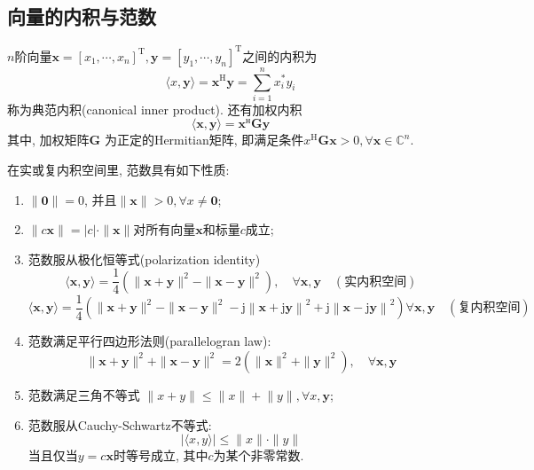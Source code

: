 \documentclass[lang=cn,10pt]{gorgeousnbook}
\numberwithin{equation}{section}%
\numberwithin{figure}{section}%
\begin{document}
\subsection{向量的内积与范数}
$n$阶向量$\boldsymbol{x}=[x_1,\cdots,x_n]^\mathrm{T},\boldsymbol{y}=[y_1,\cdots,y_n]^\mathrm{T}$之间的内积为
\begin{equation}
\langle x,\boldsymbol{y}\rangle=\boldsymbol{x^\mathrm{H}}\boldsymbol{y}=\sum_{i=1}^nx_i^*y_i
\end{equation}
称为典范内积(canonical inner product). 还有加权内积
\begin{equation}
\langle \bm{x,y}\rangle=\bm{x}^\text{н}\bm{ G y}
\end{equation}
其中, 加权矩阵$\bm{G}$ 为正定的Hermitian矩阵, 即满足条件$x^\text{H}{ \boldsymbol { G x }}>0,\forall\boldsymbol{x}\in\mathbb{C}^n$.
\begin{theorem}
在实或复内积空间里, 范数具有如下性质:
\begin{enumerate}[(1)]
\item $\|\mathbf{0}\|=0$, 并且$\|\boldsymbol{x}\|>0,\forall x\neq\boldsymbol{0}$;
\item $\|c\boldsymbol{x}\|=|c|\cdot\|\boldsymbol{x}\|$对所有向量$\bm{x}$和标量$c$成立;
\item 范数服从极化恒等式(polarization identity)
\begin{equation}
\langle\boldsymbol{x},\boldsymbol{y}\rangle=\frac14\left(\|\boldsymbol{x}+\boldsymbol{y}\|^2-\|\boldsymbol{x}-\boldsymbol{y}\|^2\right),\quad\forall\boldsymbol{x},\boldsymbol{y}\quad(\text{实内积空间})
\end{equation}
\begin{equation}
\langle\boldsymbol{x},\boldsymbol{y}\rangle=\frac14\left(\|\boldsymbol{x}+\boldsymbol{y}\|^2-\|\boldsymbol{x}-\boldsymbol{y}\|^2-\mathrm{j}\left\|\boldsymbol{x}+\mathrm{j}\boldsymbol{y}\right\|^2+\mathrm{j}\left\|\boldsymbol{x}-\mathrm{j}\boldsymbol{y}\right\|^2\right)\forall\left.\boldsymbol{x},\boldsymbol{y}\quad(\text{复内积空间})\right.
\end{equation}
\item 范数满足平行四边形法则(parallelogran law):
\begin{equation}
\|\boldsymbol{x}+\boldsymbol{y}\|^2+\|\boldsymbol{x}-\boldsymbol{y}\|^2=2(\|\boldsymbol{x}\|^2+\|\boldsymbol{y}\|^2),\quad\forall\boldsymbol{x},\boldsymbol{y}
\end{equation}
\item 范数满足三角不等式 $\lVert x+y\rVert\leqslant\lVert x\rVert+\lVert y\rVert,\forall x,\boldsymbol{y}$;
\item 范数服从Cauchy-Schwartz不等式:
\begin{equation}
|\langle x,y\rangle|\leqslant\|x\|\cdot\|y\|
\end{equation}
当且仅当$y=c\boldsymbol{x}$时等号成立, 其中$c$为某个非零常数. 
\end{enumerate}
\end{theorem}
\end{document}
